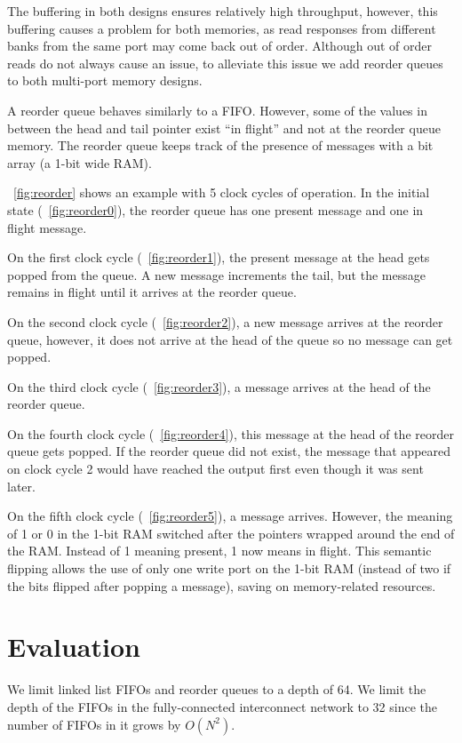     The buffering in both designs ensures relatively high throughput, however, this buffering causes a problem for both memories, as read responses from different banks from the same port may come back out of order. Although out of order reads do not always cause an issue, to alleviate this issue we add reorder queues to both multi-port memory designs.

    A reorder queue behaves similarly to a FIFO. However, some of the values in between the head and tail pointer exist ``in flight'' and not at the reorder queue memory. The reorder queue keeps track of the presence of messages with a bit array (a 1-bit wide RAM).

    \figurename~\ref{fig:reorder} shows an example with 5 clock cycles of operation. In the initial state (\figurename~\ref{fig:reorder0}), the reorder queue has one present message and one in flight message.

         On the first clock cycle (\figurename~\ref{fig:reorder1}), the present message at the head gets popped from the queue. A new message increments the tail, but the message remains in flight until it arrives at the reorder queue.

         On the second clock cycle (\figurename~\ref{fig:reorder2}), a new message arrives at the reorder queue, however, it does not arrive at the head of the queue so no message can get popped.

         On the third clock cycle (\figurename~\ref{fig:reorder3}), a message arrives at the head of the reorder queue.

         On the fourth clock cycle (\figurename~\ref{fig:reorder4}), this message at the head of the reorder queue gets popped. If the reorder queue did not exist, the message that appeared on clock cycle 2 would have reached the output first even though it was sent later.

         On the fifth clock cycle (\figurename~\ref{fig:reorder5}), a message arrives. However, the meaning of 1 or 0 in the 1-bit RAM switched after the pointers wrapped around the end of the RAM. Instead of 1 meaning present, 1 now means in flight. This semantic flipping allows the use of only one write port on the 1-bit RAM (instead of two if the bits flipped after popping a message), saving on memory-related resources. 

\section{Evaluation}
\label{sec:evaluation}
    We limit linked list FIFOs and reorder queues to a depth of 64. We limit the depth of the FIFOs in the fully-connected interconnect network to 32 since the number of FIFOs in it grows by $O(N^2)$.

